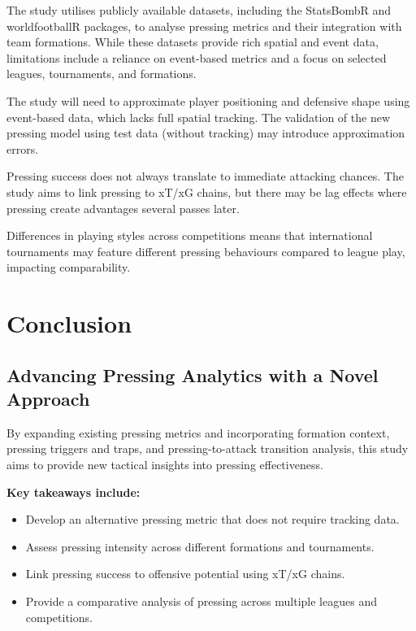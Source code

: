 The study utilises publicly available datasets, including the StatsBombR and worldfootballR packages, to analyse pressing metrics and their integration with team formations. While these datasets provide rich spatial and event data, limitations include a reliance on event-based metrics and a focus on selected leagues, tournaments, and formations.

The study will need to approximate player positioning and defensive shape using event-based data, which lacks full spatial tracking. The validation of the new pressing model using test data (without tracking) may introduce approximation errors.

Pressing success does not always translate to immediate attacking chances. The study aims to link pressing to xT/xG chains, but there may be lag effects where pressing create advantages several passes later.

Differences in playing styles across competitions means that international tournaments may feature different pressing behaviours compared to league play, impacting comparability.

\section{Conclusion}

\subsection{Advancing Pressing Analytics with a Novel Approach}

By expanding existing pressing metrics and incorporating formation context, pressing triggers and traps, and pressing-to-attack transition analysis, this study aims to provide new tactical insights into pressing effectiveness.

\textbf{Key takeaways include:}
\begin{itemize}
    \item Develop an alternative pressing metric that does not require tracking data.
    \item Assess pressing intensity across different formations and tournaments.
    \item Link pressing success to offensive potential using xT/xG chains.
    \item Provide a comparative analysis of pressing across multiple leagues and competitions.
\end{itemize}